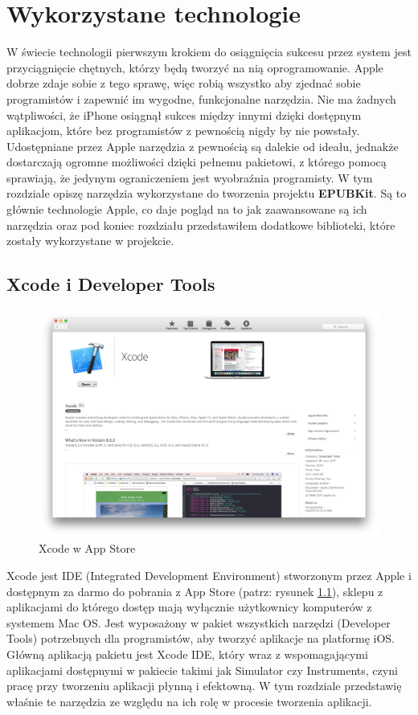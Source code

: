 \chapter{Wykorzystane technologie}

W świecie technologii pierwszym krokiem do osiągnięcia sukcesu przez system jest przyciągnięcie chętnych, którzy będą tworzyć na nią oprogramowanie. Apple dobrze zdaje sobie z tego sprawę, więc robią wszystko aby zjednać sobie programistów i zapewnić im wygodne, funkcjonalne narzędzia. Nie ma żadnych wątpliwości, że iPhone osiągnął sukces między innymi dzięki dostępnym aplikacjom, które bez programistów z pewnością nigdy by nie powstały. Udostępniane przez Apple narzędzia z pewnością są dalekie od ideału, jednakże dostarczają ogromne możliwości dzięki pełnemu pakietowi, z którego pomocą sprawiają, że jedynym ograniczeniem jest wyobraźnia programisty. W tym rozdziale opiszę narzędzia wykorzystane do tworzenia projektu \textbf{EPUBKit}. Są to głównie technologie Apple, co daje pogląd na to jak zaawansowane są ich narzędzia oraz pod koniec rozdziału przedstawiłem dodatkowe biblioteki, które zostały wykorzystane w projekcie.

\section{Xcode i Developer Tools}

\begin{figure}[ht!]
  \centering
  \includegraphics[width=120mm]{images/chapter-2-image-1-appstore.png}
  \caption{Xcode w App Store}
  \label{fig:xcodeappstore}
\end{figure}

Xcode jest IDE (Integrated Development Environment) stworzonym przez Apple i dostępnym za darmo do pobrania z App Store (patrz: rysunek \ref{fig:xcodeappstore}), sklepu z aplikacjami do którego dostęp mają wyłącznie użytkownicy komputerów z systemem Mac OS. Jest wyposażony w pakiet wszystkich narzędzi (Developer Tools) potrzebnych dla programistów, aby tworzyć aplikacje na platformę iOS. Główną aplikacją pakietu jest Xcode IDE, który wraz z wspomagającymi aplikacjami dostępnymi w pakiecie takimi jak Simulator czy Instruments, czyni pracę przy tworzeniu aplikacji płynną i efektowną. W tym rozdziale przedstawię właśnie te narzędzia ze względu na ich rolę w procesie tworzenia aplikacji.

